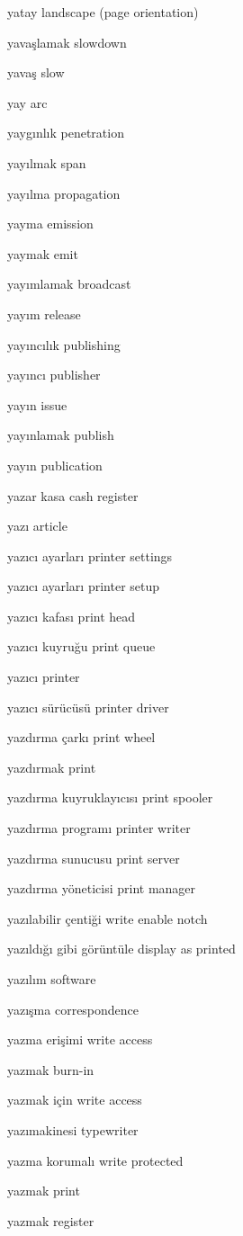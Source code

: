 \documentclass[12pt,fleqn]{article}\usepackage{../../common}
\begin{document}
yatay landscape (page orientation)

yavaşlamak slowdown

yavaş slow

yay arc

yaygınlık penetration

yayılmak span

yayılma propagation

yayma emission

yaymak emit

yayımlamak broadcast

yayım release

yayıncılık publishing

yayıncı publisher

yayın issue

yayınlamak publish

yayın publication

yazar kasa cash register

yazı article

yazıcı ayarları printer settings

yazıcı ayarları printer setup

yazıcı kafası print head

yazıcı kuyruğu print queue

yazıcı printer

yazıcı sürücüsü printer driver

yazdırma çarkı print wheel

yazdırmak print

yazdırma kuyruklayıcısı print spooler

yazdırma programı printer writer

yazdırma sunucusu print server

yazdırma yöneticisi print manager

yazılabilir çentiği write enable notch

yazıldığı gibi görüntüle display as printed

yazılım software

yazışma correspondence

yazma erişimi write access

yazmak burn-in

yazmak için write access

yazımakinesi typewriter

yazma korumalı write protected

yazmak print

yazmak register
\end{document}
